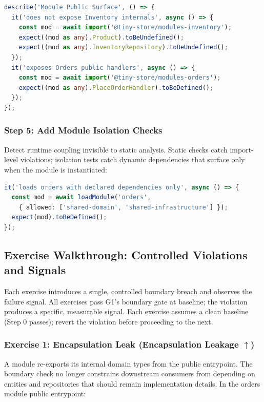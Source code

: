 \begin{lstlisting}[basicstyle=\ttfamily\scriptsize,language=TypeScript,caption={Public surface test},label={lst:g1-boundary-spec}]
describe('Module Public Surface', () => {
  it('does not expose Inventory internals', async () => {
    const mod = await import('@tiny-store/modules-inventory');
    expect((mod as any).Product).toBeUndefined();
    expect((mod as any).InventoryRepository).toBeUndefined();
  });
  it('exposes Orders public handlers', async () => {
    const mod = await import('@tiny-store/modules-orders');
    expect((mod as any).PlaceOrderHandler).toBeDefined();
  });
});
\end{lstlisting}

\subsubsection*{Step 5: Add Module Isolation Checks}

Detect runtime coupling invisible to static analysis. Static checks catch import-level violations; isolation tests catch dynamic dependencies that surface only when the module is instantiated:

\begin{lstlisting}[basicstyle=\ttfamily\scriptsize,language=TypeScript,caption={Module isolation test},label={lst:g1-isolation}]
it('loads orders with declared dependencies only', async () => {
  const mod = await loadModule('orders',
    { allowed: ['shared-domain', 'shared-infrastructure'] });
  expect(mod).toBeDefined();
});
\end{lstlisting}

\subsection*{Exercise Walkthrough: Controlled Violations and Signals}
Each exercise introduces a single, controlled boundary breach and observes the failure signal. All exercises pass G1's boundary gate at baseline; the violation produces a specific, measurable signal. Each exercise assumes a clean baseline (Step 0 passes); revert the violation before proceeding to the next.

\subsubsection*{Exercise 1: Encapsulation Leak (Encapsulation Leakage $\uparrow$)}
A module re-exports its internal domain types from the public entrypoint. The boundary check no longer constrains downstream consumers from depending on entities and repositories that should remain implementation details. In the orders module public entrypoint:

